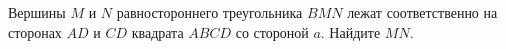 \begin{ex}
	\begin{condition}
		Вершины \( M  \) и \( N  \) равностороннего треугольника \( BMN  \) лежат соответственно на сторонах \( AD  \) и \( CD  \) квадрата \( ABCD  \) со стороной \( a \). Найдите \( MN \).
	\end{condition}
\end{ex}